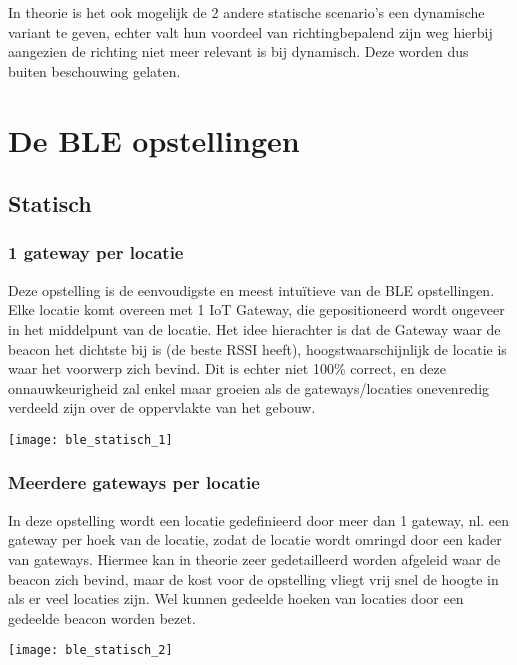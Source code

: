 In theorie is het ook mogelijk de 2 andere statische scenario's een dynamische variant te geven, echter valt hun voordeel van richtingbepalend zijn weg hierbij aangezien de richting niet meer relevant is bij dynamisch. Deze worden dus buiten beschouwing gelaten.

\section[BLE]{De BLE opstellingen}
\label{ch:ble}

\subsection{Statisch}

\subsubsection{1 gateway per locatie}
\begin{minipage}{0.65\textwidth}
Deze opstelling is de eenvoudigste en meest intuïtieve van de BLE opstellingen. Elke locatie komt overeen met 1 IoT Gateway, die gepositioneerd wordt ongeveer in het middelpunt van de locatie. Het idee hierachter is dat de Gateway waar de beacon het dichtste bij is (de beste RSSI heeft), hoogstwaarschijnlijk de locatie is waar het voorwerp zich bevind. Dit is echter niet 100\% correct, en deze onnauwkeurigheid zal enkel maar groeien als de gateways/locaties onevenredig verdeeld zijn over de oppervlakte van het gebouw. 
\end{minipage}
\hfill
\begin{minipage}{0.30\textwidth}
	\texttt{[image: ble\_statisch\_1]}
\end{minipage}

\subsubsection{Meerdere gateways per locatie}
\begin{minipage}{0.65\textwidth}
In deze opstelling wordt een locatie gedefinieerd door meer dan 1 gateway, nl. een gateway per hoek van de locatie, zodat de locatie wordt omringd door een kader van gateways. Hiermee kan in theorie zeer gedetailleerd worden afgeleid waar de beacon zich bevind, maar de kost voor de opstelling vliegt vrij snel de hoogte in als er veel locaties zijn. Wel kunnen gedeelde hoeken van locaties door een gedeelde beacon worden bezet.
\end{minipage}
\hfill
\begin{minipage}{0.30\textwidth}
	\texttt{[image: ble\_statisch\_2]}
\end{minipage}

